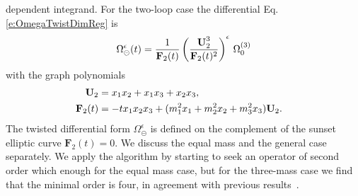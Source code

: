 \documentclass[a4paper,12pt]{article}
\numberwithin{equation}{section}
\numberwithin{figure}{section}
\def\su{\circleddash}
\begin{document}
dependent integrand. For the two-loop case the differential Eq.\eqref{e:OmegaTwistDimReg} is
\begin{equation}\label{e:OmegaSunset}
  \Omega_{\su}^{\epsilon}(t)={1\over
    \textbf{F}_2(t)}\left(\textbf{U}_2^3\over \textbf{F}_2(t)^2\right)^\epsilon  \,\Omega_0^{(3)}
\end{equation}
with the graph polynomials
\begin{align}
 \textbf{U}_2&=x_1x_2+x_1x_3+x_2x_3,\cr
  \textbf{F}_2(t)&=-tx_1x_2x_3 + (m_1^2x_1+m_2^2x_2+m_3^2x_3) \textbf{U}_2.
\end{align}
%
The twisted differential form $\Omega_\su^{\epsilon}$ is defined on the
complement of the sunset elliptic curve $\mathbf{F}_2(t)=0$.
%
We discuss the equal mass and the general case separately.
We apply the algorithm by starting to seek an operator of second order which enough for the equal mass case, but for the
three-mass case we find that the minimal order is four, in
agreement with previous results~\cite{Caffo:1998du,Remiddi:2013joa,Adams:2013nia}.

\end{document}
